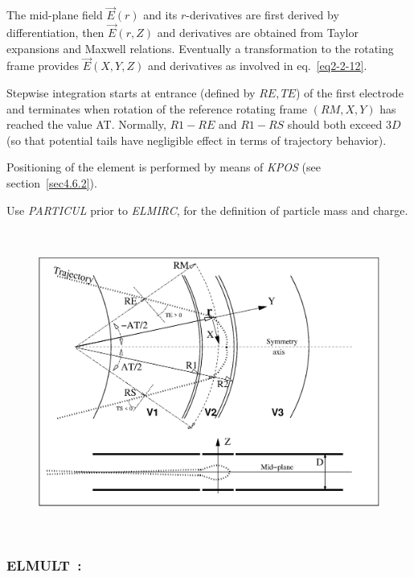 \medskip

\noindent  The mid-plane field $ \vec  E(r) $ and its $r$-derivatives are first derived by differentiation, then 
$ \vec  E(r,Z) $ and  derivatives are obtained from Taylor expansions and Maxwell relations. 
Eventually a transformation to the rotating frame provides $\vec  E(X,Y,Z)$ 
 and  derivatives as involved in eq.~\ref{eq2-2-12}. 


\noindent Stepwise integration starts at entrance (defined by $R\!E, T\!E$) of the first electrode 
and terminates when rotation of the reference  rotating frame  $(RM,X,Y)$ has reached the value AT. 
Normally, $R1-R\!E$ and $R1-R\!S$ should both  exceed  $3D$ (so 
 that potential tails  have negligible effect in terms of trajectory behavior).  

\medskip

\noindent Positioning of the element is performed by means of \textsl{KPOS} (see section~\ref{sec4.6.2}). 

\medskip

\noindent Use \textsl{PARTICUL} prior to \textsl{ELMIRC}, for the
 definition of particle mass and charge.

\vfill

\begin{figure}[H]
\centerline{\includegraphics[height=10cm]{FigELMIRC.eps}}
\caption{\label{figELMIRC} \CapELMIRC}
\end{figure}

\vfill


\newpage

\subsubsection*{ELMULT~: \ELMULTTitl} \label{ELMULT}
\medskip

